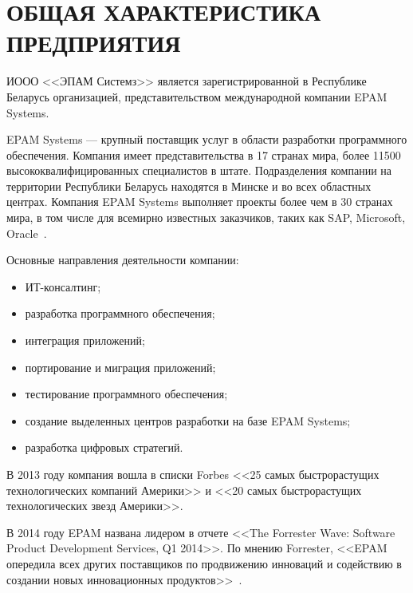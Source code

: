 \section[Общая характеристика предприятия]{%
  ОБЩАЯ ХАРАКТЕРИСТИКА ПРЕДПРИЯТИЯ
}
\label{sec:characteristics}

ИООО <<ЭПАМ Системз>> является зарегистрированной в Республике Беларусь организацией,
представительством международной компании EPAM Systems.

EPAM Systems --- крупный поставщик услуг в области разработки программного обеспечения.
Компания имеет представительства в 17 странах мира, более 11500 высококвалифицированных 
специалистов в штате.
Подразделения компании на территории Республики Беларусь находятся в Минске и
во всех областных центрах.
Компания EPAM Systems выполняет проекты более чем в 30 странах мира,
в том числе для всемирно известных заказчиков, таких как SAP, Microsoft, Oracle~\cite{epam_about_us}.

Основные направления деятельности компании:
\begin{itemize}
\item ИТ-консалтинг;
\item разработка программного обеспечения;
\item интеграция приложений;
\item портирование и миграция приложений;
\item тестирование программного обеспечения;
\item создание выделенных центров разработки на базе EPAM Systems;
\item разработка цифровых стратегий.
\end{itemize}

В 2013 году компания вошла в списки Forbes <<25 самых быстрорастущих технологических компаний Америки>>
и <<20 самых быстрорастущих технологических звезд Америки>>.

В 2014 году EPAM названа лидером в отчете 
<<The Forrester Wave: Software Product Development Services, Q1 2014>>. 
По мнению Forrester, <<EPAM опередила всех других поставщиков по продвижению инноваций и
содействию в создании новых инновационных продуктов>>~\cite{epam_wikipedia}.
